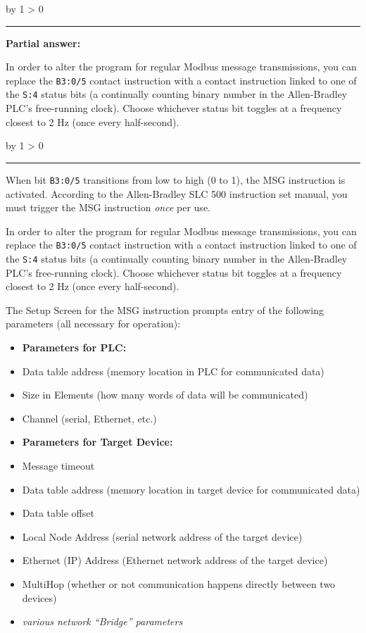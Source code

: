 \documentclass[12pt,a4paper]{article}
\def\svar{
           \advance\answnum by 1
           \ifnum \answnum > 0
                \hrule
                \vskip 3pt
                \leftline{Svar \the\answnum}
                \vskip 3pt \fi}
\def\notes{
           \advance\explnum by 1
           \ifnum \explnum > 0
                \hrule
                \vskip 3pt
                \leftline{Notes \the\explnum}
                \vskip 3pt \fi}
\begin{document}
\svar{} 

\noindent
{\bf Partial answer:}

\vskip 10pt

In order to alter the program for regular Modbus message transmissions, you can replace the {\tt B3:0/5} contact instruction with a contact instruction linked to one of the {\tt S:4} status bits (a continually counting binary number in the Allen-Bradley PLC's free-running clock).  Choose whichever status bit toggles at a frequency closest to 2 Hz (once every half-second).

\vskip 10pt \filbreak 





\notes{} 

When bit {\tt B3:0/5} transitions from low to high (0 to 1), the MSG instruction is activated.  According to the Allen-Bradley SLC 500 instruction set manual, you must trigger the MSG instruction {\it once} per use.

\vskip 10pt

In order to alter the program for regular Modbus message transmissions, you can replace the {\tt B3:0/5} contact instruction with a contact instruction linked to one of the {\tt S:4} status bits (a continually counting binary number in the Allen-Bradley PLC's free-running clock).  Choose whichever status bit toggles at a frequency closest to 2 Hz (once every half-second).

\vskip 10pt

The Setup Screen for the MSG instruction prompts entry of the following parameters (all necessary for operation):

\begin{itemize}
\item{} {\bf Parameters for PLC:}
\item{} Data table address (memory location in PLC for communicated data)
\item{} Size in Elements (how many words of data will be communicated)
\item{} Channel (serial, Ethernet, etc.)
\vskip 10pt
\item{} {\bf Parameters for Target Device:}
\item{} Message timeout
\item{} Data table address (memory location in target device for communicated data)
\item{} Data table offset
\item{} Local Node Address (serial network address of the target device)
\item{} Ethernet (IP) Address (Ethernet network address of the target device)
\item{} MultiHop (whether or not communication happens directly between two devices)
\item{} {\it various network ``Bridge'' parameters}
\end{itemize}
\end{document}
